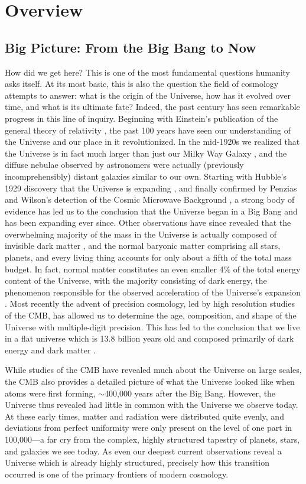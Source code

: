 \documentclass[../thesis.tex]{subfiles}
\begin{document}
\chapter{Overview}
\section{Big Picture: From the Big Bang to Now}
How did we get here?  
This is one of the most fundamental questions humanity asks itself.  
At its most basic, this is also the question the field of cosmology attempts to answer: what is the origin of the Universe, how has it evolved over time, and what is its ultimate fate? 
Indeed, the past century has seen remarkable progress in this line of inquiry.
Beginning with Einstein's publication of the general theory of relativity \citep{Einstein1916}, the past 100 years have seen our understanding of the Universe and our place in it revolutionized. 
In the mid-1920s we realized that the Universe is in fact much larger than just our Milky Way Galaxy \citep{Hubble1925}, and the diffuse nebulae observed by astronomers were actually (previously incomprehensibly) distant galaxies similar to our own.
Starting with Hubble's 1929 discovery that the Universe is expanding \citep{Hubble1929}, and finally confirmed by Penzias and Wilson's detection of the Cosmic Microwave Background \citep[CMB;][]{PenziasWilson1965, Dickeetal1965}, a strong body of evidence has led us to the conclusion that the Universe began in a Big Bang and has been expanding ever since.
Other observations have since revealed that the overwhelming majority of the mass in the Universe is actually composed of invisible dark matter \citep{RubinThonnardFord1980}, and the normal baryonic matter comprising all stars, planets, and every living thing accounts for only about a fifth of the total mass budget. 
In fact, normal matter constitutes an even smaller 4\% of the total energy content of the Universe, with the majority consisting of dark energy, the phenomenon responsible for the observed acceleration of the Universe's expansion \citep{Riessetal1998, Perlmutteretal1999}.
Most recently the advent of precision cosmology, led by high resolution studies of the CMB, has allowed us to determine the age, composition, and shape of the Universe with multiple-digit precision.  
This has led to the conclusion that we live in a flat universe which is 13.8 billion years old and composed primarily of dark energy and dark matter \citep{PlanckParams2015}.

While studies of the CMB have revealed much about the Universe on large scales, the CMB also provides a detailed picture of what the Universe looked like when atoms were first forming, $\sim$400,000 years after the Big Bang. 
However, the Universe thus revealed had little in common with the Universe we observe today.  
At these early times, matter and radiation were distributed quite evenly, and deviations from perfect uniformity were only present on the level of one part in 100,000---a far cry from the complex, highly structured tapestry of planets, stars, and galaxies we see today.
As even our deepest current observations reveal a Universe which is already highly structured, precisely how this transition occurred is one of the primary frontiers of modern cosmology.
\end{document}
